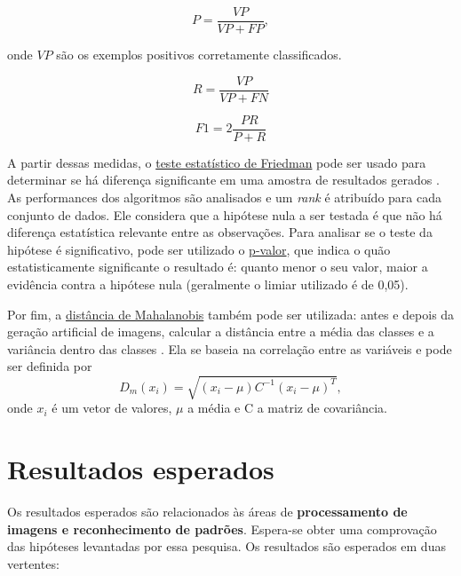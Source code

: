 \begin{description}
\begin{equation}
  P = \frac{VP}{VP + FP},
  \label{precisao}
\end{equation}

\noindent onde $VP$ são os exemplos positivos corretamente classificados.

\begin{equation}
  R = \frac{VP}{VP + FN}
  \label{revocacao}
\end{equation}

\begin{equation}
  F1 = 2 \frac{PR}{P+R}
  \label{medidaf}
\end{equation}

A partir dessas medidas, o \underline{teste estatístico de Friedman} pode ser usado para determinar se há diferença significante em uma amostra de resultados gerados \cite{friedman2010}. As performances dos algoritmos são analisados e um \textit{rank} é atribuído para cada conjunto de dados. Ele considera que a hipótese nula a ser testada é que não há diferença estatística relevante entre as observações. Para analisar se o teste da hipótese é significativo, pode ser utilizado o \underline{p-valor}, que indica o quão estatisticamente significante o resultado é: quanto menor o seu valor, maior a evidência contra a hipótese nula (geralmente o limiar utilizado é de 0,05).

Por fim, a \underline{distância de Mahalanobis} também pode ser utilizada: antes e depois da geração artificial de imagens, calcular a distância entre a média das classes e a variância dentro das classes \cite{mahalanobis2000}. Ela se baseia na correlação entre as variáveis e pode ser definida por
\begin{equation*}
  D_m(x_i) = \sqrt{(x_i - \mu)C^{-1}(x_i-\mu)^T},
\end{equation*}
\noindent onde $x_i$ é um vetor de valores, $\mu$ a média e C a matriz de covariância.

\end{description}

\section{Resultados esperados}
\label{sec:resultados}

Os resultados esperados são relacionados às áreas de \textbf{processamento de imagens e reconhecimento de padrões}. Espera-se obter uma comprovação das hipóteses levantadas por essa pesquisa. Os resultados são esperados em duas vertentes:

